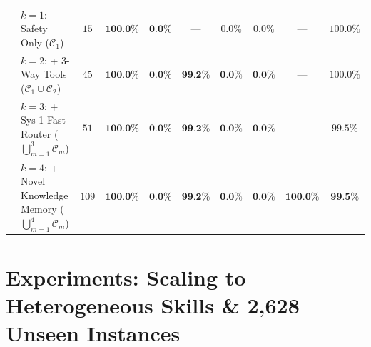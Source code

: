 \documentclass[10pt,twocolumn]{article}
\begin{document}
\begin{table}[t]
{\begin{tabular}{llcccccccc}
 & $k=1$: Safety Only ($\mathcal{C}_1$) & $15$ & $\textbf{100.0\%}$ & $\textbf{0.0\%}$ & --- & $0.0\%$ & $0.0\%$ & --- & $100.0\%$ \\
 & $k=2$: + 3-Way Tools ($\mathcal{C}_1 \cup \mathcal{C}_2$) & $45$ & $\textbf{100.0\%}$ & $\textbf{0.0\%}$ & $\textbf{99.2\%}$ & $\textbf{0.0\%}$ & $\textbf{0.0\%}$ & --- & $100.0\%$ \\
 & $k=3$: + Sys-1 Fast Router ($\bigcup_{m=1}^3 \mathcal{C}_m$) & $51$ & $\textbf{100.0\%}$ & $\textbf{0.0\%}$ & $\textbf{99.2\%}$ & $\textbf{0.0\%}$ & $\textbf{0.0\%}$ & --- & $99.5\%$ \\
 & $k=4$: + Novel Knowledge Memory ($\bigcup_{m=1}^4 \mathcal{C}_m$) & $109$ & $\textbf{100.0\%}$ & \textcolor{green!50!black}{$\textbf{0.0\%}$} & $\textbf{99.2\%}$ & \textcolor{green!50!black}{$\textbf{0.0\%}$} & \textcolor{green!50!black}{$\textbf{0.0\%}$} & \textcolor{green!50!black}{$\textbf{100.0\%}$} & $\textbf{99.5\%}$ \\
\bottomrule
\end{tabular}%
}
\label{tab:scaling_os}
\end{table}

\section{Experiments: Scaling to Heterogeneous Skills \& 2,628 Unseen Instances}
\end{document}
